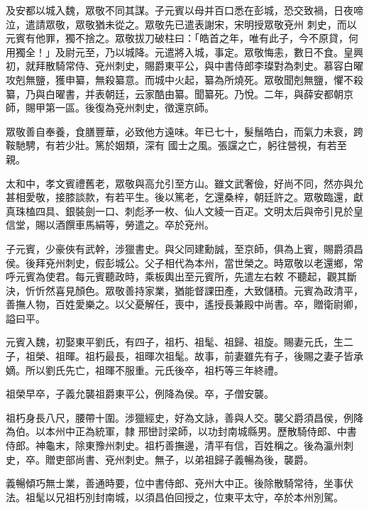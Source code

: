 \begin{pinyinscope}
 及安都以城入魏，眾敬不同其謀。子元賓以母并百口悉在彭城，恐交致禍，日夜啼泣，遣請眾敬，眾敬猶未從之。眾敬先已遣表謝宋，宋明授眾敬兗州
 刺史，而以元賓有他罪，獨不捨之。眾敬拔刀破柱曰：「皓首之年，唯有此子，今不原貸，何用獨全！」及尉元至，乃以城降。元遣將入城，事定。眾敬悔恚，數日不食。皇興初，就拜散騎常侍、兗州刺史，賜爵東平公，與中書侍郎李璨對為刺史。慕容白曜攻剋無鹽，獲申纂，無殺纂意。而城中火起，纂為所燒死。眾敬聞剋無鹽，懼不殺纂，乃與白曜書，并表朝廷，云家酷由纂。聞纂死。乃悅。二年，與薛安都朝京師，賜甲第一區。後復為兗州刺史，徵還京師。



 眾敬善自奉養，食膳豐華，必致他方遠味。年已七十，髮鬚皓白，而氣力未衰，跨鞍馳騁，有若少壯。篤於姻類，深有
 國士之風。張讜之亡，躬往營視，有若至親。



 太和中，孝文賓禮舊老，眾敬與高允引至方山。雖文武奢儉，好尚不同，然亦與允甚相愛敬，接膝談款，有若平生。後以篤老，乞還桑梓，朝廷許之。眾敬臨還，獻真珠榼四具、銀裝劍一口、刺彪矛一枚、仙人文綾一百疋。文明太后與帝引見於皇信堂，賜以酒饌車馬絹等，勞遣之。卒於兗州。



 子元賓，少豪俠有武幹，涉獵書史。與父同建勳誠，至京師，俱為上賓，賜爵須昌侯。後拜兗州刺史，假彭城公。父子相代為本州，當世榮之。時眾敬以老還鄉，常呼元賓為使君。每元賓聽政時，乘板輿出至元賓所，先遣左右敕
 不聽起，觀其斷決，忻忻然喜見顏色。眾敬善持家業，猶能督課田產，大致儲積。元賓為政清平，善撫人物，百姓愛樂之。以父憂解任，喪中，遙授長兼殿中尚書。卒，贈衛尉卿，謚曰平。



 元賓入魏，初娶東平劉氏，有四子，祖朽、祖髦、祖歸、祖旋。賜妻元氏，生二子，祖榮、祖暉。祖朽最長，祖暉次祖髦。故事，前妻雖先有子，後賜之妻子皆承嫡。所以劉氏先亡，祖暉不服重。元氏後卒，祖朽等三年終禮。



 祖榮早卒，子義允襲祖爵東平公，例降為侯。卒，子僧安襲。



 祖朽身長八尺，腰帶十圍。涉獵經史，好為文詠，善與人交。襲父爵須昌侯，例降為伯。以本州中正為統軍，隸
 邢巒討梁師，以功封南城縣男。歷散騎侍郎、中書侍郎。神龜末，除東豫州刺史。祖朽善撫邊，清平有信，百姓稱之。後為瀛州刺史，卒。贈吏部尚書、兗州刺史。無子，以弟祖歸子義暢為後，襲爵。



 義暢傾巧無士業，善通時要，位中書侍郎、兗州大中正。後除散騎常待，坐事伏法。祖髦以兄祖朽別封南城，以須昌伯回授之，位東平太守，卒於本州別駕。




\end{pinyinscope}
